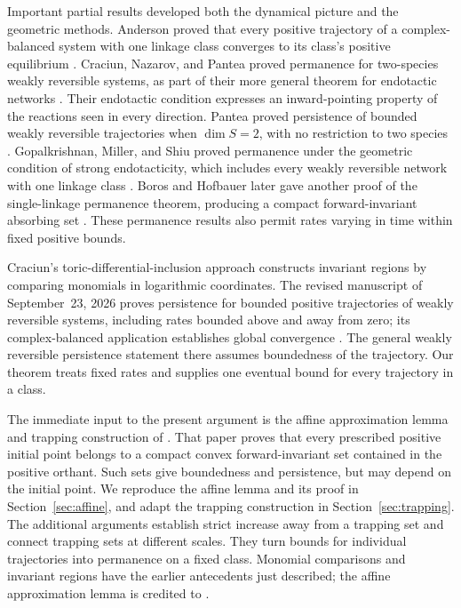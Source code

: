 Important partial results developed both the dynamical picture and the
geometric methods. Anderson proved that every positive trajectory of a
complex-balanced system with one linkage class converges to its class's
positive equilibrium
\cite[Corollary~4.11]{Anderson2011}. Craciun, Nazarov, and Pantea proved
permanence for two-species weakly reversible systems, as part of their
more general theorem for endotactic networks
\cite[Theorem~6.4]{CraciunNazarovPantea2013}. Their endotactic condition
expresses an inward-pointing property of the reactions seen in every
direction. Pantea proved persistence of bounded
weakly reversible trajectories when $\dim S=2$, with no restriction to
two species \cite[Theorem~5.1]{Pantea2012}. Gopalkrishnan, Miller, and Shiu proved
permanence under the geometric condition of strong endotacticity,
which includes every weakly reversible network with one linkage class
\cite[Theorems~1.1 and~1.3]{GopalkrishnanMillerShiu2014}.
Boros and Hofbauer later gave another proof of the single-linkage
permanence theorem, producing a compact forward-invariant absorbing
set \cite[Theorem~4.2]{BorosHofbauer2020}. These permanence results
also permit rates varying in time within fixed positive bounds.

Craciun's toric-differential-inclusion approach constructs invariant
regions by comparing monomials in logarithmic coordinates. The revised
manuscript of September~23, 2026 proves persistence for bounded positive
trajectories of weakly reversible systems, including rates bounded above
and away from zero; its complex-balanced application establishes global
convergence \cite[Section~8, final remark]{Craciun2026}. The general
weakly reversible persistence statement there assumes boundedness of
the trajectory. Our theorem treats fixed rates and supplies one
eventual bound for every trajectory in a class.

The immediate input to the present argument is the affine approximation
lemma and trapping construction of \cite{OpenAI2026}. That paper proves
that every prescribed positive initial point belongs to a compact
convex forward-invariant set contained in the positive orthant. Such sets
give boundedness and persistence, but may depend on the initial point.
We reproduce the affine lemma and
its proof in Section~\ref{sec:affine}, and adapt the trapping construction
in Section~\ref{sec:trapping}. The additional arguments establish strict
increase away from a trapping set and connect trapping sets at different
scales. They turn bounds for individual trajectories into permanence
on a fixed class. Monomial comparisons and invariant regions have the
earlier antecedents just described; the affine approximation lemma is
credited to \cite[Lemma~2.1 and Corollary~2.2]{OpenAI2026}.


